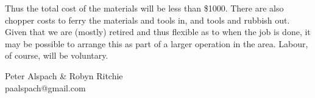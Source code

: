 \documentclass[12pt]{article} %
\begin{document}
Thus the total cost of the materials will be less than \$1000.  There are also chopper costs to ferry the materials and tools in, and tools and rubbish out.  Given that we are (mostly) retired and thus flexible as to when the job is done, it may be possible to arrange this as part of a larger operation in the area.  Labour, of course, will be voluntary.

\begin{flushright}
Peter Alspach \& Robyn Ritchie\\
paalspach@gmail.com
\end{flushright}
\end{document}
